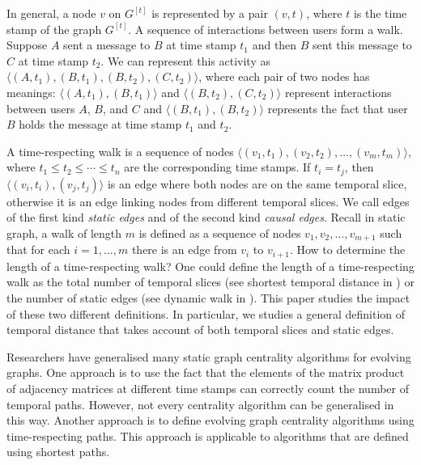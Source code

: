 \documentclass[12pt]{article}
\theoremstyle{definition}
\begin{document}
In general, a node $v$ on $G^{[t]}$ is represented by a pair $(v, t)$, where $t$ is the time stamp of the graph $G^{[t]}$.
A sequence of interactions between users form a walk. Suppose $A$ sent a message to $B$ at time stamp $t_1$
and then $B$ sent this message to $C$ at time stamp $t_2$. We can represent this activity as $\langle (A,t_1), (B,t_1), (B, t_2), (C,t_2)\rangle$, where each pair of two nodes has meanings: $\langle (A,t_1), (B,t_1) \rangle$ and $\langle (B,t_2), (C,t_2) \rangle$ represent interactions between users $A$, $B$, and $C$ and $\langle (B,t_1), (B,t_2) \rangle$ represents the fact that user $B$ holds the message at time stamp $t_1$ and $t_2$.

A time-respecting walk is a sequence of nodes $\langle (v_1, t_1), (v_2, t_2), \ldots ,(v_m, t_m)\rangle$, where $t_1 \le t_2 \le \cdots \le t_n$ are the corresponding time stamps. If $t_i = t_j$, then $\langle (v_i, t_i), (v_j, t_j) \rangle$ is an edge where both nodes are on the same temporal slice,  otherwise it is an edge linking nodes from different temporal slices.
We call edges of the first kind \emph{static edges} and of the second kind \emph{causal edges}.
Recall in static graph, a walk of length $m$ is defined as a sequence of nodes $v_1, v_2, \ldots, v_{m+1}$ such that for each $i = 1, \ldots, m$ there is an edge from $v_i$ to $v_{i+1}$. How to determine the length of a time-respecting walk?
One could define the length of a time-respecting walk as the total number of temporal slices (see shortest temporal distance in \cite{tang09}) or the number of static edges (see dynamic walk in \cite{grindrod11}). This paper studies the impact of these two different definitions. In particular, we studies a general definition of temporal distance that takes account of both temporal slices and static edges.


Researchers have generalised many static graph centrality algorithms for evolving graphs. One approach is to use the fact that the elements of the matrix product of adjacency matrices at different time stamps can correctly count the number of temporal paths.
However, not every centrality algorithm can be generalised in this way. Another approach is to define evolving graph centrality algorithms using time-respecting paths. This approach is applicable to algorithms that are defined using shortest paths.


\end{document}
